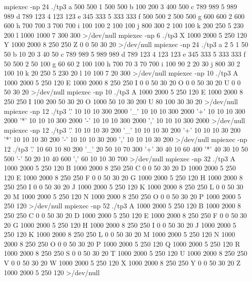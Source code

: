 \li mpiexec -np 24 ./tp3  a 500 500 1 500 500 b 100 200 3 400 500 c 789 989 5 989 989 d 789 123 4 123 123 e 345 333 5 333 333 f 500 500 2 500 500 g 600 600 2 600 600 h 700 700 3 700 700 i 100 100 2 100 100 j 800 300 2 100 100 k 200 250 5 230 200 l 1000 1000 7 300 300 >/dev/null
\li mpiexec -np 6 ./tp3  X 1000 2000 5 250 120 Y 1000 2000 8 250 250 Z 0 0 50 30 20 >/dev/null
\li mpiexec -np 24 ./tp3  a 2 5 1 50 50 b 10 20 3 40 50 c 789 989 5 989 989 d 789 123 4 123 123 e 345 333 5 333 333 f 50 500 2 50 100 g 60 60 2 100 100 h 700 70 3 70 700 i 100 90 2 20 30 j 800 30 2 100 10 k 20 250 5 230 20 l 10 100 7 20 300 >/dev/null
\li mpiexec -np 10 ./tp3  A 1000 2000 5 250 120 E 1000 2000 8 250 250 I 0 0 50 30 20 O 0 0 50 30 20 U 0 0 50 30 20 >/dev/null
\li mpiexec -np 10 ./tp3  A 1000 2000 5 250 120 E 1000 2000 8 250 250 I 100 200 50 30 20 O 1000 50 10 30 200 U 80 100 30 30 20 >/dev/null
\li mpiexec -np 12 ./tp3  '.' 10 10 10 300 2000 '_' 10 10 10 300 2000 '+' 10 10 10 300 2000 '*' 10 10 10 300 2000 '-' 10 10 10 300 2000 ',' 10 10 10 300 2000 >/dev/null
\li mpiexec -np 12 ./tp3  '.' 10 10 10 30 200 '_' 10 10 10 30 200 '+' 10 10 10 30 200 '*' 10 10 10 30 200 '-' 10 10 10 30 200 ',' 10 10 10 30 200 >/dev/null
\li mpiexec -np 12 ./tp3  '.' 10 60 10 80 200 '_' 20 50 10 70 300 '+' 30 40 10 60 400 '*' 40 30 10 50 500 '-' 50 20 10 40 600 ',' 60 10 10 30 700 >/dev/null
\li mpiexec -np 32 ./tp3  A 1000 2000 5 250 120 B 1000 2000 8 250 250 C 0 0 50 30 20 D 1000 2000 5 250 120 E 1000 2000 8 250 250 F 0 0 50 30 20 G 1000 2000 5 250 120 H 1000 2000 8 250 250 I 0 0 50 30 20 J 1000 2000 5 250 120 K 1000 2000 8 250 250 L 0 0 50 30 20 M 1000 2000 5 250 120 N 1000 2000 8 250 250 O 0 0 50 30 20 P 1000 2000 5 250 120 >/dev/null
\li mpiexec -np 52 ./tp3  A 1000 2000 5 250 120 B 1000 2000 8 250 250 C 0 0 50 30 20 D 1000 2000 5 250 120 E 1000 2000 8 250 250 F 0 0 50 30 20 G 1000 2000 5 250 120 H 1000 2000 8 250 250 I 0 0 50 30 20 J 1000 2000 5 250 120 K 1000 2000 8 250 250 L 0 0 50 30 20 M 1000 2000 5 250 120 N 1000 2000 8 250 250 O 0 0 50 30 20 P 1000 2000 5 250 120 Q 1000 2000 5 250 120 R 1000 2000 8 250 250 S 0 0 50 30 20 T 1000 2000 5 250 120 U 1000 2000 8 250 250 V 0 0 50 30 20 W 1000 2000 5 250 120 X 1000 2000 8 250 250 Y 0 0 50 30 20 Z 1000 2000 5 250 120 >/dev/null
